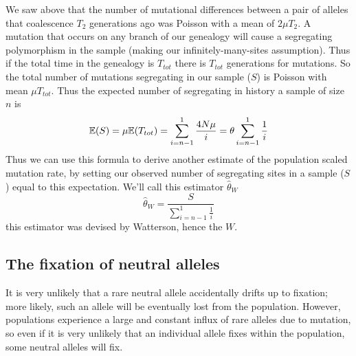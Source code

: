 We saw above that the number of mutational differences between a pair
of alleles that coalescence $T_2$ generations ago was Poisson with a
mean of $2 \mu T_2$. A mutation that occurs on any branch of our
genealogy will cause a segregating polymorphism in the sample
(making our infinitely-many-sites assumption). Thus if the total time
in the genealogy is $T_{tot}$ there is $T_{tot}$
generations for mutations. So the total number of mutations
segregating in our sample ($S$) is Poisson with mean $\mu T_{tot}$. Thus the
expected number of segregating  in history a sample of size $n$ is
\begin{equation}
\mathbb{E}(S) = \mu \mathbb{E}(T_{tot}) = \sum_{i=n-1}^1 \frac{4N\mu }{i} = \theta
\sum_{i=n-1}^1 \frac{1}{i}
\end{equation}
Thus we can use this formula to derive another estimate of the
population scaled mutation rate, by setting our observed number of
segregating sites in a sample ($S$) equal to this expectation. We'll call this estimator $\widehat{\theta}_W$
\begin{equation}
\widehat{\theta}_W =\frac{ S}{\sum_{i=n-1}^1 \frac{1}{i}}  
\end{equation}
this estimator was devised by Watterson, hence the $W$.


\subsection{The fixation of neutral alleles} It is very unlikely that a rare
neutral allele accidentally drifts up to fixation; more likely, such an allele
will be eventually lost from the population. However, populations experience a
large and constant influx of rare alleles due to mutation, so even if it is
very unlikely that an individual allele fixes within the population, some
neutral alleles will fix.  \\




